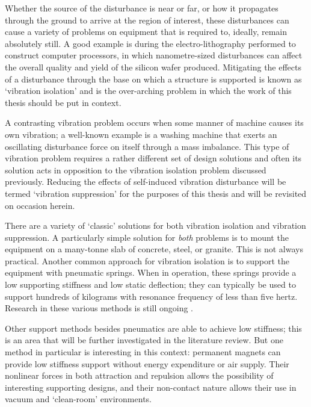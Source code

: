 \documentclass[11pt,a4paper]{memoir}
\begin{document}
Whether the source of the disturbance is near or far, or how it propagates through the ground to arrive at the region of interest, these disturbances can cause a variety of problems on equipment that is required to, ideally, remain absolutely still.
A good example is during the electro-lithography performed to construct computer processors, in which nanometre-sized disturbances can affect the overall quality and yield of the silicon wafer produced.
Mitigating the effects of a disturbance through the base on which a structure is supported is known as `vibration isolation' and is the over-arching problem in which the work of this thesis should be put in context.

A contrasting vibration problem occurs when some manner of machine causes its own vibration; a well-known example is a washing machine that exerts an oscillating disturbance force on itself through a mass imbalance.
This type of vibration problem requires a rather different set of design solutions and often its solution acts in opposition to the vibration isolation problem discussed previously.
Reducing the effects of self-induced vibration disturbance will be termed `vibration suppression'
for the purposes of this thesis and will be revisited on occasion herein.

There are a variety of `classic' solutions for both vibration isolation and vibration suppression.
A particularly simple solution for \emph{both} problems is to mount the equipment on a many-tonne slab of concrete, steel, or granite.
This is not always practical.
Another common approach for vibration isolation is to support the equipment with pneumatic springs.
When in operation, these springs provide a low supporting stiffness and low static deflection; they can typically be used to support hundreds of kilograms with resonance frequency of less than five hertz.
Research in these various methods is still ongoing \cite{yoshioka2001,chen2007,kawashima2007,hong2010-rsi}.

Other support methods besides pneumatics are able to achieve low stiffness; this is an area that will be further investigated in the literature review.
But one method in particular is interesting in this context: permanent magnets can provide low stiffness support without energy expenditure or air supply.
Their nonlinear forces in both attraction and repulsion allows the possibility of interesting supporting designs, and their non-contact nature allows their use in vacuum and `clean-room' environments.
\end{document}
